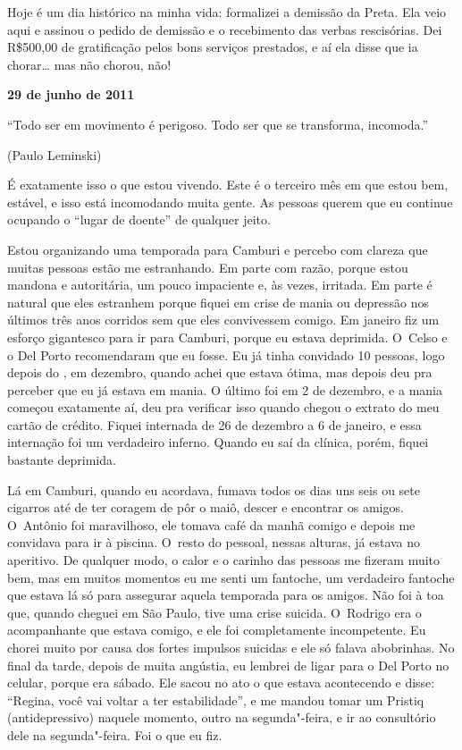 Hoje é um dia histórico na minha vida: formalizei a demissão da Preta.
Ela veio aqui e assinou o pedido de demissão e o recebimento das verbas
rescisórias. Dei R\$500,00 de gratificação pelos bons serviços
prestados, e aí ela disse que ia chorar… mas não chorou, não!

\begin{center}\asterisc{}\end{center}

\begin{flushright}\textbf{29 de junho de 2011}\end{flushright}

\epigraph{``Todo ser em movimento é perigoso. Todo ser que se transforma,
incomoda.''}{(Paulo Leminski)} 

É exatamente isso o que estou vivendo. Este é o terceiro mês em que
estou bem, estável, e isso está incomodando muita gente. As pessoas
querem que eu continue ocupando o ``lugar de doente'' de qualquer jeito.

Estou organizando uma temporada para Camburi e percebo com clareza que
muitas pessoas estão me estranhando. Em parte com razão, porque estou
mandona e autoritária, um pouco impaciente e, às vezes, irritada. Em
parte é natural que eles estranhem porque fiquei em crise de mania ou
depressão nos últimos três anos corridos sem que eles convivessem
comigo. Em janeiro fiz um esforço gigantesco para ir para Camburi,
porque eu estava deprimida. O~Celso e o Del Porto recomendaram que eu
fosse. Eu já tinha convidado 10 pessoas, logo depois do , em
dezembro, quando achei que estava ótima, mas depois deu pra perceber que
eu já estava em mania. O último  foi em 2 de dezembro, e a mania
começou exatamente aí, deu pra verificar isso quando chegou o extrato do
meu cartão de crédito. Fiquei internada de 26 de dezembro a 6 de
janeiro, e essa internação foi um verdadeiro inferno. Quando eu saí da
clínica, porém, fiquei bastante deprimida.

Lá em Camburi, quando eu acordava, fumava todos os dias uns seis ou sete
cigarros até de ter coragem de pôr o maiô, descer e encontrar os amigos.
O~Antônio foi maravilhoso, ele tomava café da manhã comigo e depois me
convidava para ir à piscina. O~resto do pessoal, nessas alturas, já
estava no aperitivo. De qualquer modo, o calor e o carinho das pessoas
me fizeram muito bem, mas em muitos momentos eu me senti um fantoche, um
verdadeiro fantoche que estava lá só para assegurar aquela temporada
para os amigos. Não foi à toa que, quando cheguei em São Paulo, tive uma
crise suicida. O~Rodrigo era o acompanhante que estava comigo, e ele foi
completamente incompetente. Eu chorei muito por causa dos fortes
impulsos suicidas e ele só falava abobrinhas. No final da tarde, depois
de muita angústia, eu lembrei de ligar para o Del Porto no celular,
porque era sábado. Ele sacou no ato o que estava acontecendo e disse:
``Regina, você vai voltar a ter estabilidade'', e me mandou tomar um
Pristiq (antidepressivo) naquele momento, outro na segunda"-feira, e ir
ao consultório dele na segunda"-feira. Foi o que eu fiz.

